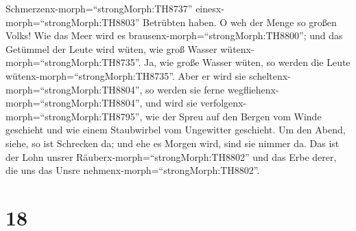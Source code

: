 Schmerzenx-morph=``strongMorph:TH8737''
einesx-morph=``strongMorph:TH8803'' Betrübten haben.  O weh
der Menge so großen Volks! Wie das Meer wird es
brausenx-morph=``strongMorph:TH8800''; und das Getümmel der Leute wird
wüten, wie groß Wasser wütenx-morph=``strongMorph:TH8735''.
 Ja, wie große Wasser wüten, so werden die Leute
wütenx-morph=``strongMorph:TH8735''. Aber er wird sie
scheltenx-morph=``strongMorph:TH8804'', so werden sie ferne
wegfliehenx-morph=``strongMorph:TH8804'', und wird sie
verfolgenx-morph=``strongMorph:TH8795'', wie der Spreu auf den Bergen
vom Winde geschieht und wie einem Staubwirbel vom Ungewitter geschieht.
 Um den Abend, siehe, so ist Schrecken da; und ehe es
Morgen wird, sind sie nimmer da. Das ist der Lohn unsrer
Räuberx-morph=``strongMorph:TH8802'' und das Erbe derer, die uns das
Unsre nehmenx-morph=``strongMorph:TH8802''.

\hypertarget{section-17}{%
\section{18}\label{section-17}}

